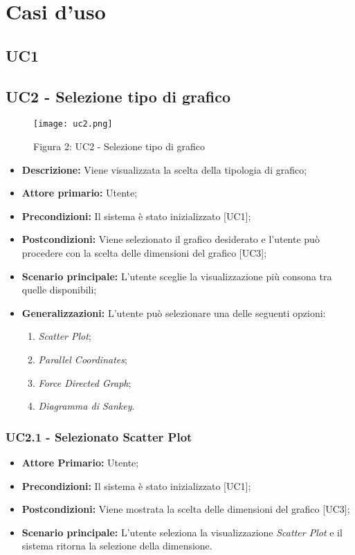 \chapter{Casi d'uso}

\section{UC1}

\section{UC2 - Selezione tipo di grafico}
\begin{figure}[H]
 \texttt{[image: uc2.png]}
 \vspace{-5mm}
 \caption*{Figura 2: UC2 - Selezione tipo di grafico}
\end{figure}

 \begin{itemize}
     \item \textbf{Descrizione:} Viene visualizzata la scelta della tipologia di grafico;
     \item \textbf{Attore primario:} Utente;
     \item \textbf{Precondizioni:} Il sistema è stato inizializzato [UC1];
     \item \textbf{Postcondizioni:} Viene selezionato il grafico desiderato e l'utente può procedere con la scelta delle dimensioni del grafico [UC3];
     \item \textbf{Scenario principale:} L'utente sceglie la visualizzazione più consona tra quelle disponibili;
     \item \textbf{Generalizzazioni:} L'utente può selezionare una delle seguenti opzioni:
     \begin{enumerate}
         \item \textit{Scatter Plot};
         \item \textit{Parallel Coordinates};
         \item \textit{Force Directed Graph};
         \item \textit{Diagramma di Sankey}.
     \end{enumerate}
 \end{itemize}

 \subsection{UC2.1 - Selezionato Scatter Plot}
 \begin{itemize}
     \item \textbf{Attore Primario:} Utente;
     \item \textbf{Precondizioni:} Il sistema è stato inizializzato [UC1];
     \item \textbf{Postcondizioni:} Viene mostrata la scelta delle dimensioni del grafico [UC3];
     \item \textbf{Scenario principale:} L'utente seleziona la visualizzazione \textit{Scatter Plot} e il sistema ritorna la selezione della dimensione.
 \end{itemize}
